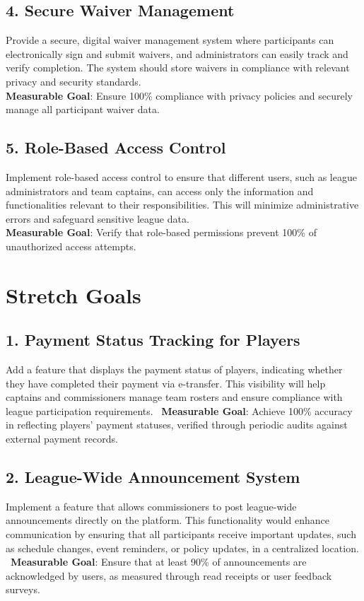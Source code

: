 \documentclass{article}
\begin{document}
\subsection*{4. Secure Waiver Management}
Provide a secure, digital waiver management system where participants can electronically sign and submit waivers, and administrators can easily track and verify completion. The system should store waivers in compliance with relevant privacy and security standards. \\
\textbf{Measurable Goal}: Ensure 100\% compliance with privacy policies and securely manage all participant waiver data.

\subsection*{5. Role-Based Access Control}
Implement role-based access control to ensure that different users, such as league administrators and team captains, can access only the information and functionalities relevant to their responsibilities. This will minimize administrative errors and safeguard sensitive league data. \\
\textbf{Measurable Goal}: Verify that role-based permissions prevent 100\% of unauthorized access attempts.

\section{Stretch Goals}

\subsection*{1. Payment Status Tracking for Players}
Add a feature that displays the payment status of players, indicating whether they have completed their payment via e-transfer. This visibility will help captains and commissioners manage team rosters and ensure compliance with league participation requirements. \
\textbf{Measurable Goal}: Achieve 100\% accuracy in reflecting players’ payment statuses, verified through periodic audits against external payment records.

\subsection*{2. League-Wide Announcement System}
Implement a feature that allows commissioners to post league-wide announcements directly on the platform. This functionality would enhance communication by ensuring that all participants receive important updates, such as schedule changes, event reminders, or policy updates, in a centralized location. \
\textbf{Measurable Goal}: Ensure that at least 90\% of announcements are acknowledged by users, as measured through read receipts or user feedback surveys.
\end{document}
